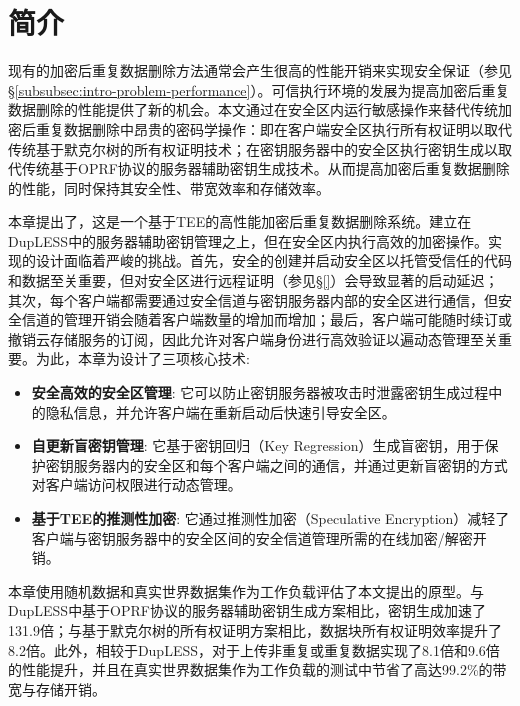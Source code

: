 \section{简介}
\label{sec:sgxdedup-introduction}

现有的加密后重复数据删除方法通常会产生很高的性能开销来实现安全保证（参见\S\ref{subsubsec:intro-problem-performance}）。可信执行环境\cite{trustzone,sgx,MK-TME,AMDSEV}的发展为提高加密后重复数据删除的性能提供了新的机会。本文通过在安全区内运行敏感操作来替代传统加密后重复数据删除中昂贵的密码学操作：即在客户端安全区执行所有权证明以取代传统基于默克尔树的所有权证明技术；在密钥服务器中的安全区执行密钥生成以取代传统基于OPRF协议的服务器辅助密钥生成技术。从而提高加密后重复数据删除的性能，同时保持其安全性、带宽效率和存储效率。
 
本章提出了\sysnameS，这是一个基于TEE的高性能加密后重复数据删除系统。\sysnameS 建立在DupLESS\cite{bellare2013DupLESS}中的服务器辅助密钥管理之上，但在安全区内执行高效的加密操作。实现\sysnameS 的设计面临着严峻的挑战。首先，安全的创建并启动安全区以托管受信任的代码和数据至关重要，但对安全区进行远程证明（参见\S\ref{}）会导致显著的启动延迟；其次，每个客户端都需要通过安全信道与密钥服务器内部的安全区进行通信，但安全信道的管理开销会随着客户端数量的增加而增加；最后，客户端可能随时续订或撤销云存储服务的订阅，因此允许对客户端身份进行高效验证以遍动态管理至关重要。为此，本章为\sysnameS 设计了三项核心技术: 

\begin{itemize}[leftmargin=*]
    \item \textbf{安全高效的安全区管理}:
        它可以防止密钥服务器被攻击时泄露密钥生成过程中的隐私信息，并允许客户端在重新启动后快速引导安全区。
    \item \textbf{自更新盲密钥管理}:
        它基于密钥回归（Key Regression）\cite{fu06}生成盲密钥，用于保护密钥服务器内的安全区和每个客户端之间的通信，并通过更新盲密钥的方式对客户端访问权限进行动态管理。
    \item \textbf{基于TEE的推测性加密}:
        它通过推测性加密（Speculative Encryption）\cite{eduardo2019Speculative}减轻了客户端与密钥服务器中的安全区间的安全信道管理所需的在线加密/解密开销。
\end{itemize}

本章使用随机数据和真实世界数据集\cite{fsl,meyer2011deduplication}作为工作负载评估了本文提出的\sysnameS 原型。与DupLESS\cite{bellare2013DupLESS}中基于OPRF协议的服务器辅助密钥生成方案相比，密钥生成加速了131.9倍；与基于默克尔树的所有权证明方案\cite{halevi11}相比，数据块所有权证明效率提升了8.2倍。此外，相较于DupLESS\cite{bellare2013DupLESS}，\sysnameS 对于上传非重复或重复数据实现了8.1倍和9.6倍的性能提升，并且在真实世界数据集作为工作负载的测试中节省了高达99.2\%的带宽与存储开销。

